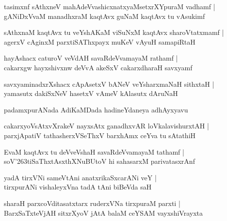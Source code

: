 \documentclass[twoside,12pt,openright]{book}
\def\S{\char'263}
\newcounter{shloka}[chapter]
\begin{document}
\begin{shloka}
tasimxnf sAthxneV mahAdeVvashicxnatxyaMsetxrXYpuraM vadhamf |\\
gANiDxVvaM manadhxraM kaqtAvx guNaM kaqtAvx tu vAsukimf
\end{shloka}

\begin{shloka}
sAthxnaM kaqtAvx tu veYshAKaM viSuNxM kaqtAvx sharoVtatxmamf |\\
agerxV cAginxM parxtiSAThxpayx muKeV vAyuH samapiRtaH 
\end{shloka}

\begin{shloka}
hayAshacx caturoV veVdAH savaRdeVvamayaM rathamf |\\
cakarxgw hayxshivxnw deVvA akeSxV cakarxdharaH savxyamf
\end{shloka}

\begin{shloka}
savxyaminadxrXshacx cApAsetxV bANeV veYsharxmaNaH sithxtaH |\\
yamasutx dakiSxNeV hasetxV vAmeV kAlasutx dAruNaH
\end{shloka}

\begin{center}
padamxpurANada AdiKaMDada hadineYdaneya adhAyxyavu
\end{center}

\begin{shloka}
cakarxyoVsAtxvXrakeV nayxsAtx ganadhxvAR loVkalavishurxtAH |\\
parxjApatiV tathasherxVSeThxV barxhAmx ceYva tu sAtathiH 
\end{shloka}

\begin{shloka}
EvaM kaqtAvx tu deVveVshaH savaRdeVvamayaM tathamf |\\
soV\S tiSaThxtAsxthXNuBUtoV hi sahasarxM parivatasxrAnf
\end{shloka}

\begin{shloka}
yadA tirxVNi sameVtAni anatxrikaSxcarANi veY |\\
tirxpurANi vishaleyxVna tadA tAni biBeVda saH
\end{shloka}

\begin{shloka}
sharaH parxcoVditasatxtarx ruderxVNa tirxpuraM parxti |\\
BarxSaTxteVjAH sitxrXyoV jAtA balaM ceYSAM vayxshiVrayxta
\end{shloka}
\end{document}
